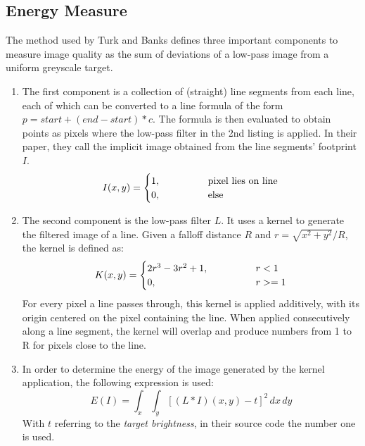 \subsection{Energy Measure}
The method used by Turk and Banks defines three important components to measure image quality as the sum of deviations of a low-pass image from a uniform greyscale target.
\begin{enumerate}
    \item The first component is a collection of (straight) line segments from each line,
    each of which can be converted to a line formula of the form $p = start + (end - start) * c$.
    The formula is then evaluated to obtain points as pixels where the low-pass filter in the 2nd listing is applied.
    In their paper, they call the implicit image obtained from the line segments' footprint $I$.
    \begin{equation*}
        I(x,y) = \begin{cases}
            1, \kern4em & \text{pixel lies on line}\\
            0,          & \text{else}
    \end{cases}
    \end{equation*}
    
    \item The second component is the low-pass filter $L$.
    It uses a kernel to generate the filtered image of a line.
    Given a falloff distance $R$ and $r=\sqrt{x^2+y^2} / R$, the kernel is defined as:
    \begin{equation*}
        K(x,y) = \begin{cases}
            2r^3 - 3r^2 + 1, \kern4em & r < 1\\
            0,               & r >= 1
        \end{cases}
    \end{equation*}
    For every pixel a line passes through, this kernel is applied additively, with its origin centered on the pixel containing the line.
    When applied consecutively along a line segment, the kernel will overlap and produce numbers from 1 to R for pixels close to the line.
    
    \item In order to determine the energy of the image generated by the kernel application, the following expression is used:
    \begin{equation*}
        E(I) = \int_x\int_y\left[(L\ast I)(x,y)-t\right]^2\,dx\,dy
    \end{equation*}
    With $t$ referring to the \textit{target brightness}, in their source code the number one is used.
\end{enumerate}

